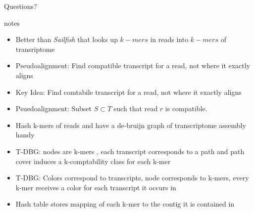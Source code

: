 \documentclass[10pt]{beamer}
\begin{document}
\begin{frame}[standout]
  Questions?
\end{frame}

\appendix


\begin{frame}{notes}
\begin{itemize}[<+-| alert@+>]
\item Better than \emph{Sailfish} that looks up $k-mers$ in reads into $k-mers$ of transriptome
\item Pseudoalignment: Find compatible transcript for a read, not where it exactly aligns
\item Key Idea: Find comtabile transcript for a read, not where it exactly aligns
\item Psuedoalignment: Subset  $S \subset T$ such that read $r$ is compatible.
\item Hash k-mers of reads and have a de-bruijn graph of transcriptome assembly handy
\item T-DBG: nodes are k-mers , each transcript corresponds to a path and path cover induces a k-comptability class for each k-mer
\item T-DBG: Colors correspond to transcripts, node corresponds to k-mers, every k-mer receives a color for each transcript it occurs in
\item Hash table stores mapping of each k-mer to the contig it is contained in
\end{itemize}

\end{frame}





%  
%  

\end{document}
